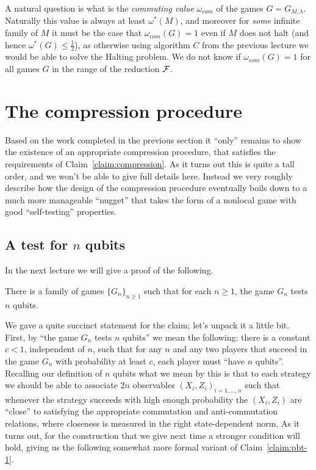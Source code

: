\begin{remark}
A natural question is what is the \emph{commuting value} $\omega_{com}$ of the games $G=G_{M,\lambda}$. Naturally this value is always at least $\omega^*(M)$, and moreover for \emph{some} infinite family of $M$ it must be the case that $\omega_{com}(G)=1$ even if $M$ does not halt (and hence $\omega^*(G) \leq \frac{1}{2}$), as otherwise using algorithm $C$ from the previous lecture we would be able to solve the Halting problem. We do not know if $\omega_{com}(G)=1$ for all games $G$ in the range of the reduction $\mathcal{F}$. 
\end{remark}

\section{The compression procedure}

Based on the work completed in the previous section it ``only'' remains to show the existence of an appropriate compression procedure, that satisfies the requirements of Claim~\ref{claim:compression}. As it turns out this is quite a tall order, and we won't be able to give full details here. Instead we very roughly describe how the design of the compression procedure eventually boils down to a much more manageable ``nugget'' that takes the form of a nonlocal game with good ``self-testing'' properties.

\subsection{A test for $n$ qubits}

In the next lecture we will give a proof of the following. 

\begin{claim}\label{claim:pbt-1}
There is a family of games $\{G_n\}_{n\geq 1}$ such that for each $n\geq 1$, the game $G_n$ tests $n$ qubits. 
\end{claim}

We gave a quite succinct statement for the claim; let's unpack it a little bit. First, by ``the game $G_n$ tests $n$ qubits'' we mean the following: there is a constant $c<1$, independent of $n$, such that for any $n$ and any two players that succeed in the game $G_n$ with probability at least $c$, each player must ``have $n$ qubits''. Recalling our definition of $n$ qubits what we mean by this is that to each strategy we should be able to associate $2n$ observables $(X_i,Z_i)_{i=1,\ldots,n}$ such that whenever the strategy succeeds with high enough probability the $(X_i,Z_i)$ are ``close'' to satisfying the appropriate commutation and anti-commutation relations, where closeness is measured in the right state-dependent norm. As it turns out, for the construction that we give next time a stronger condition will hold, giving us the following somewhat more formal variant of Claim~\ref{claim:pbt-1}.

